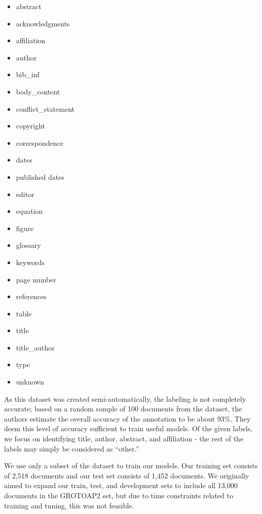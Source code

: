 \documentclass{acm_proc_article-sp}
\begin{document}
\begin{itemize}
\item abstract 
\item acknowledgments 
\item affiliation
\item author
\item bib\_inf
\item body\_content 
\item conflict\_statement 
\item copyright 
\item correspondence
\item dates 
\item published dates
\item editor
\item equation 
\item figure 
\item glossary
\item keywords
\item page number
\item references
\item table
\item title 
\item title\_author 
\item type 
\item unknown 
\end{itemize}
As this dataset was created semi-automatically, the labeling is not completely accurate; based on a random sample of 100 documents from the dataset, the authors estimate the overall accuracy of the annotation to be about 93\%. They deem this level of accuracy sufficient to train useful models. Of the given labels, we focus on identifying title, author, abstract, and affiliation - the rest of the labels may simply be considered as “other.”

We use only a subset of the dataset to train our models. Our training set consists of 2,518 documents and our test set consists of 1,452 documents. We originally aimed to expand our train, test, and development sets to include all 13,000 documents in the GROTOAP2 set, but due to time constraints related to training and tuning, this was not feasible.
\end{document}
